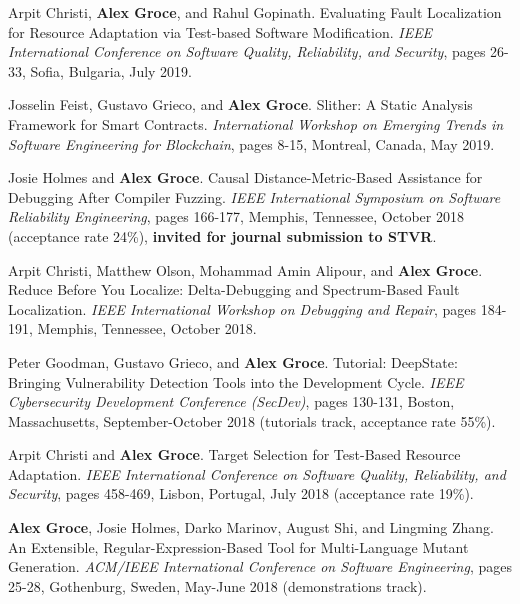 \documentclass[ComputerScience]{vita}
\begin{document}
\begin{vita}
\begin{Refereed Conference and Workshop Publications}
\item Arpit Christi, {\bf Alex Groce}, and Rahul Gopinath.
\newblock Evaluating Fault Localization for Resource Adaptation via Test-based Software Modification.
\newblock \emph{IEEE International Conference on Software Quality,
  Reliability, and Security}, pages 26-33,
Sofia, Bulgaria, July 2019.

\item Josselin Feist, Gustavo Grieco, and {\bf Alex Groce}. 
\newblock Slither: A Static Analysis Framework for Smart Contracts. 
\newblock \emph{International Workshop on Emerging Trends in Software
  Engineering for Blockchain}, pages 8-15, Montreal,
Canada, May 2019.
  
\item Josie Holmes and {\bf Alex Groce}. 
\newblock Causal Distance-Metric-Based Assistance for Debugging After 
Compiler Fuzzing. 
\newblock \emph{IEEE International Symposium on Software Reliability 
  Engineering}, pages 166-177, Memphis, Tennessee, October 
2018 (acceptance rate 24\%), {\bf invited for journal submission to STVR}.

\item Arpit Christi, Matthew Olson, Mohammad Amin Alipour, and {\bf Alex Groce}. 
\newblock Reduce Before You Localize: Delta-Debugging and Spectrum-Based Fault Localization. 
\newblock \emph{IEEE International Workshop on Debugging and Repair},
pages 184-191, Memphis, Tennessee, October  2018.

\item Peter Goodman, Gustavo Grieco,  and {\bf Alex Groce}. 
\newblock Tutorial: DeepState: Bringing Vulnerability Detection Tools 
into the Development Cycle. 
\newblock \emph{IEEE Cybersecurity Development Conference (SecDev)},
pages 130-131, Boston, Massachusetts, September-October 2018 (tutorials track, 
acceptance rate 55\%). 

\item Arpit Christi and {\bf Alex Groce}.
\newblock Target Selection for Test-Based Resource Adaptation.
\newblock \emph{IEEE International Conference on Software Quality,
  Reliability, and Security}, pages 458-469, 
Lisbon, Portugal, July 2018 (acceptance rate 19\%).

\item {\bf Alex Groce},  Josie Holmes, Darko Marinov, August Shi, and Lingming Zhang.
\newblock An Extensible, Regular-Expression-Based Tool for Multi-Language Mutant Generation.
\newblock \emph{ACM/IEEE International Conference on Software
  Engineering}, pages 25-28, Gothenburg, Sweden, May-June 2018 (demonstrations track).


\end{Refereed Conference and Workshop Publications}
\end{vita}
\end{document}
